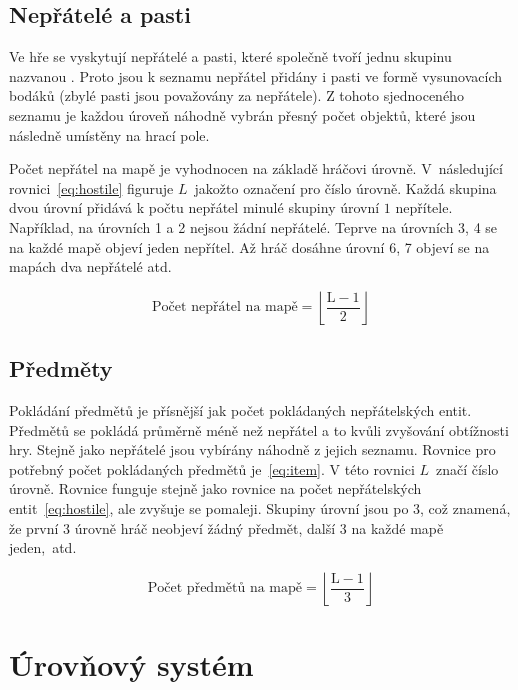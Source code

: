 \subsection*{Nepřátelé a pasti}
Ve hře se vyskytují nepřátelé a pasti, které společně tvoří jednu skupinu nazvanou . Proto jsou k seznamu nepřátel přidány i pasti ve formě vysunovacích bodáků (zbylé pasti jsou považovány za nepřátele). Z tohoto sjednoceného seznamu je každou úroveň náhodně vybrán přesný počet objektů, které jsou následně umístěny na hrací pole.

Počet nepřátel na mapě je vyhodnocen na základě hráčovi úrovně. V~následující rovnici~\ref{eq:hostile} figuruje $L$~jakožto označení pro číslo úrovně. Každá skupina dvou úrovní přidává k počtu nepřátel minulé skupiny úrovní $1$ nepřítele. Například, na úrovních 1 a 2 nejsou žádní nepřátelé. Teprve na úrovních 3, 4 se na každé mapě objeví jeden nepřítel. Až hráč dosáhne úrovní 6, 7 objeví se na mapách dva nepřátelé atd.

\begin{equation}
    \text{Počet nepřátel na mapě} = \left\lfloor \frac{\text{L} - 1}{2} \right\rfloor
\label{eq:hostile}
\end{equation}

\subsection*{Předměty}
Pokládání předmětů je přísnější jak počet pokládaných nepřátelských entit. Předmětů se pokládá průměrně méně než nepřátel a to kvůli zvyšování obtížnosti hry. Stejně jako nepřátelé jsou vybírány náhodně z jejich seznamu. Rovnice pro potřebný počet pokládaných předmětů je~\ref{eq:item}. V této rovnici $L$~značí číslo úrovně. Rovnice funguje stejně jako rovnice na počet nepřátelských entit~\ref{eq:hostile}, ale zvyšuje se pomaleji. Skupiny úrovní jsou po 3, což znamená, že první 3 úrovně hráč neobjeví žádný předmět, další 3 na každé mapě jeden,~atd.

\begin{equation}
    \text{Počet předmětů na mapě} = \left\lfloor \frac{\text{L} - 1}{3} \right\rfloor
\label{eq:item}
\end{equation}

\section{Úrovňový systém}

